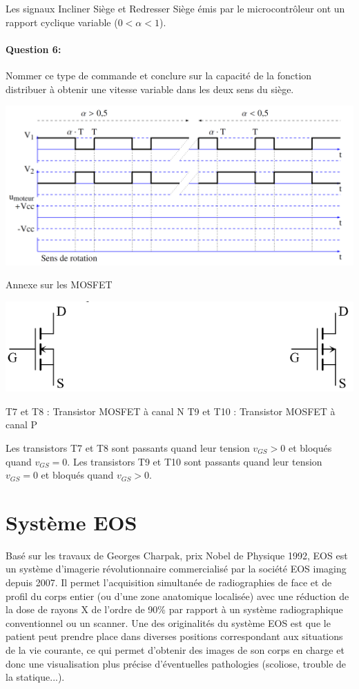 Les signaux \og Incliner Siège \fg et \og Redresser Siège \fg émis par le microcontrôleur ont un rapport cyclique variable ($0<\alpha<1$).

\paragraph{Question 6:} Nommer ce type de commande et conclure sur la capacité de la fonction \og distribuer \fg à obtenir une vitesse variable dans les deux sens du siège.

\begin{center}
 \includegraphics[width=0.9\linewidth]{img/doc_rep_chair}
\end{center}

Annexe sur les MOSFET

\begin{center}
 \includegraphics[width=0.7\linewidth]{img/img03}
\end{center}

T7 et T8 : Transistor MOSFET à canal N \hfill T9 et T10 : Transistor MOSFET à canal P

Les transistors T7 et T8 sont passants quand leur tension $v_{GS}>0$ et bloqués quand $v_{GS}=0$.
Les transistors T9 et T10 sont passants quand leur tension $v_{GS}=0$ et bloqués quand $v_{GS}>0$.

\newpage

\section{Système EOS}

Basé sur les travaux de Georges Charpak, prix Nobel de Physique 1992, EOS est un système d'imagerie
révolutionnaire commercialisé par la société EOS imaging depuis 2007. Il permet l'acquisition simultanée de
radiographies de face et de profil du corps entier (ou d'une zone anatomique localisée) avec une réduction de la
dose de rayons X de l'ordre de 90\% par rapport à un système radiographique conventionnel ou un scanner. Une
des originalités du système EOS est que le patient peut prendre place dans diverses positions correspondant
aux situations de la vie courante, ce qui permet d'obtenir des images de son corps
\og en charge \fg et donc une visualisation plus précise d'éventuelles pathologies (scoliose, trouble de la statique...).

